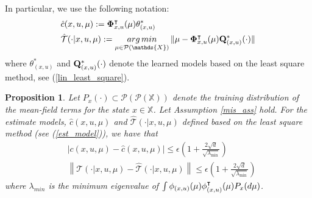 \documentclass[twoside,11pt]{article}
\newtheorem{prop}{Proposition}[section]
\def\argmin{\mathop{\rm arg\, min}}
\def\P{{\mathcal P}}
\begin{document}
In particular, we use the following notation:
\begin{align}\label{est_model}
    &\hat{c}(x,u,\mu) := {\bf \Phi}^\intercal_{x,u}(\mu)\theta^*_{(x,u)} \nonumber\\
    &\hat{\mathcal{T}}(\cdot|x,u,\mu):=\argmin_{\mu\in\P(\mathds{X})}\|\mu-{\bf \Phi}^\intercal_{x,u}(\mu){\bf Q}^*_{(x,u)}(\cdot) \|
\end{align}
where $\theta^*_{(x,u)}$ and ${\bf Q}^*_{(x,u)}(\cdot)$ denote the learned models based on the least square method, see (\ref{lin_least_square}).



\begin{prop}
Let $P_{x}(\cdot) \subset \P(\P(\mathds{X}))$ denote the training distribution of the mean-field terms for the state $x\in\mathds{X}$. Let Assumption \ref{mis_ass} hold.  For the estimate models, $\hat{c}(x,u,\mu)$ and $\hat{\mathcal{T}}(\cdot|x,u,\mu)$ defined based on the least square method (see (\ref{est_model})), we have that
\begin{align*}
&\left| c(x,u,\mu) - \hat{c}(x,u,\mu)  \right| \leq   \epsilon\left(1+\frac{2\sqrt{d}}{\sqrt{\lambda_{\min}}}\right)\\
&\left\| \mathcal{T}(\cdot|x,u,\mu) - \hat{\mathcal{T}}(\cdot|x,u,\mu) \right\| \leq  \epsilon\left(1+\frac{2\sqrt{d}}{\sqrt{\lambda_{\min}}}\right)
\end{align*}
where $\lambda_{min}$ is the minimum eigenvalue of $\int {\bf \phi}_{(x,u)}(\mu){\bf \phi}_{(x,u)}^\intercal (\mu)P_x(d\mu)$.
\end{prop}
\end{document}
